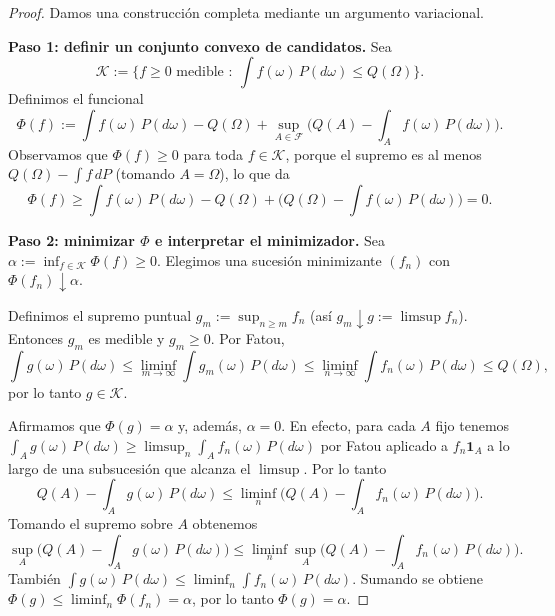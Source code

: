 \documentclass[11pt,a4paper]{article}
\theoremstyle{plain}
\theoremstyle{definition}
\theoremstyle{remark}
\newcommand{\1}{\mathbf{1}}
\newcommand{\cF}{\mathcal{F}}
\begin{document}
\begin{proof}
Damos una construcción completa mediante un argumento variacional.

\smallskip
\noindent\textbf{Paso 1: definir un conjunto convexo de candidatos.}
Sea
\[
\mathcal{K}:=\Big\{f\ge0 \text{ medible }:\ \int f(\omega)\,P(d\omega) \le Q(\Omega)\Big\}.
\]
Definimos el funcional
\[
\Phi(f):=\int f(\omega)\,P(d\omega) - Q(\Omega) + \sup_{A\in\cF}\big(Q(A)-\int_A f(\omega)\,P(d\omega)\big).
\]
Observamos que $\Phi(f)\ge 0$ para toda $f\in\mathcal{K}$, porque el supremo es al menos $Q(\Omega)-\int f\,dP$ (tomando $A=\Omega$), lo que da
\[
\Phi(f)\ge \int f(\omega)\,P(d\omega) - Q(\Omega) + \big(Q(\Omega)-\int f(\omega)\,P(d\omega)\big)=0.
\]

\smallskip
\noindent\textbf{Paso 2: minimizar $\Phi$ e interpretar el minimizador.}
Sea $\alpha:=\inf_{f\in\mathcal{K}}\Phi(f)\ge0$. Elegimos una sucesión minimizante $(f_n)$ con $\Phi(f_n)\downarrow\alpha$.

Definimos el supremo puntual $g_m:=\sup_{n\ge m} f_n$ (así $g_m\downarrow g:=\limsup f_n$).
Entonces $g_m$ es medible y $g_m\ge0$. Por Fatou,
\[
\int g(\omega)\,P(d\omega) \le \liminf_{m\to\infty}\int g_m(\omega)\,P(d\omega) \le \liminf_{n\to\infty}\int f_n(\omega)\,P(d\omega) \le Q(\Omega),
\]
por lo tanto $g\in\mathcal{K}$.

Afirmamos que $\Phi(g)=\alpha$ y, además, $\alpha=0$.
En efecto, para cada $A$ fijo tenemos $\int_A g(\omega)\,P(d\omega) \ge \limsup_n \int_A f_n(\omega)\,P(d\omega)$ por Fatou aplicado a $f_n\1_A$ a lo largo de una subsucesión que alcanza el $\limsup$. Por lo tanto
\[
Q(A)-\int_A g(\omega)\,P(d\omega) \le \liminf_n \big(Q(A)-\int_A f_n(\omega)\,P(d\omega)\big).
\]
Tomando el supremo sobre $A$ obtenemos
\[
\sup_A\Big(Q(A)-\int_A g(\omega)\,P(d\omega)\Big)
\le \liminf_n \sup_A\Big(Q(A)-\int_A f_n(\omega)\,P(d\omega)\Big).
\]
También $\int g(\omega)\,P(d\omega) \le \liminf_n\int f_n(\omega)\,P(d\omega)$. Sumando se obtiene $\Phi(g)\le \liminf_n \Phi(f_n)=\alpha$, por lo tanto $\Phi(g)=\alpha$.


\end{proof}
\end{document}
